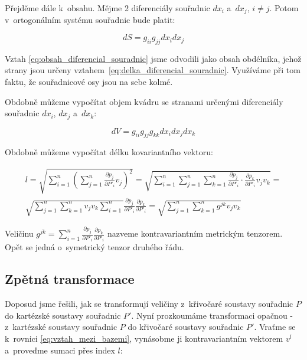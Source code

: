 Přejděme dále k~obsahu. Mějme 2 diferenciály souřadnic \(dx_i\) a~\(dx_j\), \(i \neq j\). Potom v~ortogonálním systému souřadnic bude platit:

\begin{equation}
\label{eq:obsah_diferencial_souradnic}
dS = g_{ii} g_{jj} dx_i dx_j
\end{equation}

Vztah \eqref{eq:obsah_diferencial_souradnic} jsme odvodili jako obsah obdélníka, jehož strany jsou určeny vztahem~\eqref{eq:delka_diferencial_souradnic}. Využíváme při tom faktu, že souřadnicové osy jsou na sebe kolmé.

Obdobně můžeme vypočítat objem kvádru se stranami určenými diferenciály souřadnic \(dx_i\), \(dx_j\) a~\(dx_k\):

\begin{equation}
\label{eq:objem_diferencial_souradnic}
dV = g_{ii} g_{jj} g_{kk} dx_i dx_j dx_k
\end{equation}

Obdobně můžeme vypočítat délku kovariantního vektoru:

\begin{equation}
\begin{split}
l = \sqrt{\sum_{i=1}^n \left(\sum_{j=1}^n \frac{\partial p_j}{\partial P'_i} v_j \right)^2} = \sqrt{\sum_{i=1}^n \sum_{j=1}^n \sum_{k=1}^n \frac{\partial p_j}{\partial P'_i} \cdot \frac{\partial p_k}{\partial P'_i} v_j v_k} = \\
\sqrt{\sum_{j=1}^n \sum_{k=1}^n v_j v_k \sum_{i=1}^n} \frac{\partial p_j}{\partial P'_i} \frac{\partial p_k}{\partial P'_i} = \sqrt{\sum_{j=1}^n \sum_{k=1}^n g^{jk} v_j v_k}
\end{split}
\end{equation}

Veličinu \(g^{jk} = \sum_{i=1}^n \frac{\partial p_j}{\partial P'_i} \frac{\partial p_k}{\partial P'_i}\) nazveme kontravariantním metrickým tenzorem. Opět se jedná o~symetrický tenzor druhého řádu.


\subsection{Zpětná transformace}

Doposud jsme řešili, jak se transformují veličiny z~křivočaré soustavy souřadnic \(P\) do kartézské soustavy souřadnic \(P'\). Nyní prozkoumáme transformaci opačnou - z~kartézské soustavy souřadnic \(P\) do křivočaré soustavy souřadnic \(P'\).
Vraťme se k~rovnici \eqref{eq:vztah_mezi_bazemi}, vynásobme ji kontravariantním vektorem \(v^l\) a~proveďme sumaci přes index \(l\):
 
